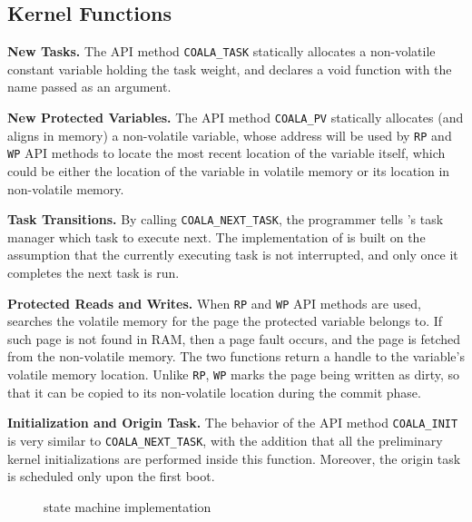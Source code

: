 \subsection{Kernel Functions}

\textbf{New Tasks.} The API method \texttt{COALA\_TASK} statically allocates a non-volatile constant variable holding the task weight, and declares a void function with the name passed as an argument.

\textbf{New Protected Variables.} The API method \texttt{COALA\_PV} statically allocates (and aligns in memory) a non-volatile variable, whose address will be used by \texttt{RP} and \texttt{WP} API methods to locate the most recent location of the variable itself, which could be either the location of the variable in volatile memory or its location in non-volatile memory.

\textbf{Task Transitions.} By calling \texttt{COALA\_NEXT\_TASK}, the programmer tells \sys's task manager which task to execute next. The implementation of \sys is built on the assumption that the currently executing task is not interrupted, and only once it completes the next task is run.

\textbf{Protected Reads and Writes.} When \texttt{RP} and \texttt{WP} API methods are used, \sys searches the volatile memory for the page the protected variable belongs to. If such page is not found in RAM, then a page fault occurs, and the page is fetched from the non-volatile memory. The two functions return a handle to the variable's volatile memory location. Unlike \texttt{RP}, \texttt{WP} marks the page being written as dirty, so that it can be copied to its non-volatile location during the commit phase.

\textbf{Initialization and Origin Task.} The behavior of the API method \texttt{COALA\_INIT} is very similar to \texttt{COALA\_NEXT\_TASK}, with the addition that all the preliminary kernel initializations are performed inside this function. Moreover, the origin task is scheduled only upon the first boot.

\begin{wrapfigure}{t!}{0.5\textwidth}
	\centering
	\caption{\sys state machine implementation }
	\label{fig:coala_state_machine}
\end{wrapfigure}

